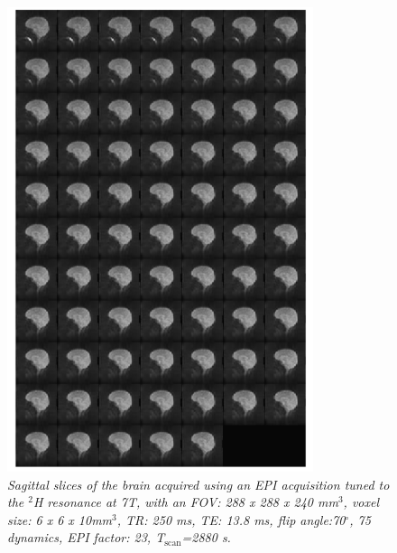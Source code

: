 \documentclass[class=article, crop=false]{standalone}
\begin{document}
\begin{figure}[H]
    \centering
    \includegraphics[width=0.8\textwidth]{Figures/D2O/EPI.png}
    \caption{\textit{Sagittal slices of the brain acquired using an EPI acquisition tuned to the $^2$H resonance at 7T, with an FOV: 288 x 288 x 240 mm$^3$, voxel size: 6 x 6 x 10mm$^3$, TR: 250 ms, TE: 13.8 ms, flip angle:70$^\circ$, 75 dynamics, EPI factor: 23, T$_\textrm{scan}$=2880 s.}}
    \label{fig:D2O:EPI}
\end{figure}

\end{document}
